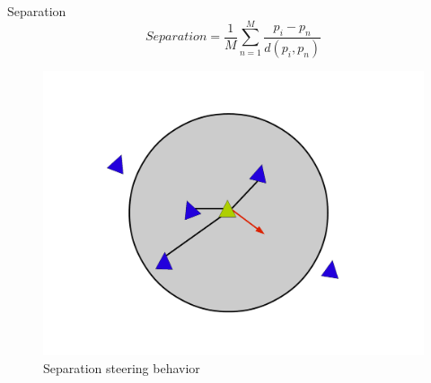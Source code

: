 \documentclass[red]{beamer}
\begin{document}
\begin{frame}{Separation}
	\begin{equation}
	\label{separationEquation}
	Separation =\frac{1}{M} \sum_{n=1}^{M} \frac{p_i - p_n}{d(p_i,p_n)}
	\end{equation}
	
	\begin{figure}[htbp]
	\begin{center}
	\includegraphics[scale=0.15]{../figures/separation.pdf}
	\caption{Separation steering behavior}
	\label{separation}
	\end{center}
	\end{figure}
\end{frame}
\end{document}
